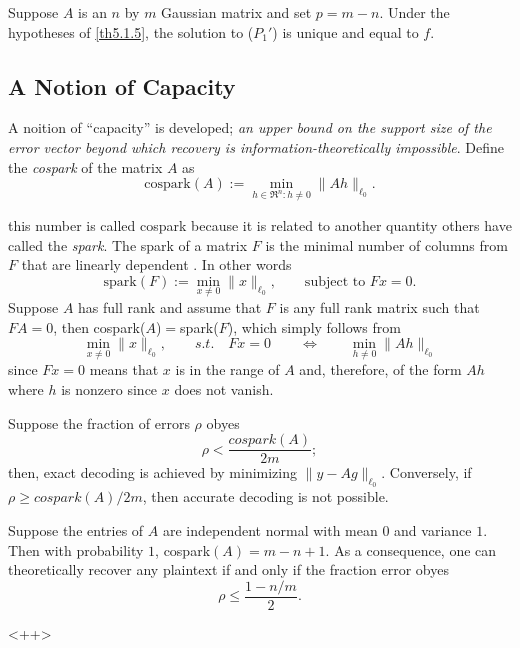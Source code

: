 \begin{corollary}
    \label{cr5.1.6}
    Suppose $A$ is an $n$ by $m$ Gaussian matrix and set $p = m-n$. Under the hypotheses of \cref{th5.1.5}, the solution to ($P_1'$) is unique and equal to $f$.
\end{corollary}

\subsection{A Notion of Capacity}
A noition of ``capacity'' is developed; \emph{\textcolor[rgb]{1,0,0}{an upper bound on the support size of the error vector beyond which recovery is information-theoretically impossible}}. Define the \emph{cospark} of the matrix $A$ as 
\begin{equation}
    \text{cospark}(A) := \min\limits_{h \in \mathfrak{R}^n : h \neq 0} \|Ah\|_{\ell_0}.
    \label{eq5.1.11}
\end{equation}

this number is called cospark because it is related to another quantity others have called the \emph{spark}. The spark of a matrix $F$ is the minimal number of columns from $F$ that are linearly dependent \cite{2-33,2-27}. In other words
\begin{equation*}
    \text{spark}(F) := \min\limits_{x \neq 0}\|x\|_{\ell_0}, \qquad \text{subject to } Fx=0.
\end{equation*}
Suppose $A$ has full rank and assume that $F$ is any full rank matrix such that $FA=0$, then cospark($A$)$=$spark($F$), which simply follows from
\begin{equation*}
    \min\limits_{x \neq 0} \|x\|_{\ell_0}, \qquad s.t. \quad Fx=0 \qquad \Leftrightarrow \qquad \min\limits_{h \neq 0} \|Ah\|_{\ell_0}
\end{equation*}
since $Fx=0$ means that $x$ is in the range of $A$ and, therefore, of the form $Ah$ where $h$ is nonzero since $x$ does not vanish.


\begin{lemma}
    Suppose the fraction of errors $\rho$ obyes
    \begin{equation}
        \rho < \dfrac{cospark(A)}{2m};
        \label{eq5.1.12}
    \end{equation}
    then, exact decoding is achieved by minimizing $\|y-Ag\|_{\ell_0}$. Conversely, if $\rho \geq cospark(A)/2m$, then accurate decoding is not possible.
    \label{lm5.1.7}
\end{lemma}


\begin{corollary}
    \label{cr5.1.8}
    Suppose the entries of $A$ are independent normal with mean $0$ and variance $1$. Then with probability $1$, cospark$(A)=m-n+1$. As a consequence, one can theoretically recover any plaintext if and only if the fraction error obyes
    \begin{equation}
        \rho \leq \dfrac{1-n/m}{2}.
        \label{eq5.1.13}
    \end{equation}
\end{corollary}<++>



\label{eq5.3.23}






